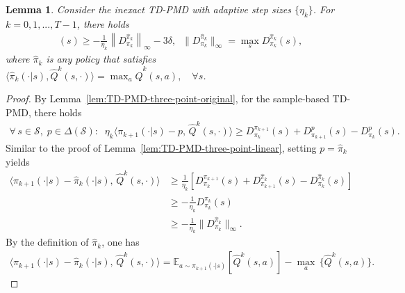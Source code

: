 \documentclass[10pt]{article}
\newcommand{\calS}{\mathcal{S}}
\newcommand{\calT}{\mathcal{T}}
\newcommand{\E}{\mathbb{E}}
\newcommand{\ls}{\left}
\newcommand{\rs}{\right}
\theoremstyle{plain}
\newtheorem{lemma}[theorem]{Lemma}
\theoremstyle{definition}
\begin{document}
\begin{lemma}
    Consider the inexact TD-PMD  with adaptive step sizes $\{ \eta_k \}$. For $k=0, 1, ..., T-1$,  there holds
    \begin{align}
       [\widehat{\calT}^{\pi_{k+1}} V^k - \calT V^k](s) \geq -\frac{1}{\eta
         _k}\ls\| {D}_{\pi_k}^{\widehat{\pi}_k} \rs\|_\infty - 3\delta, \;\; \|{D}_{\pi_k}^{\widehat{\pi}_k}\|_\infty = \max_{s} D_{\pi_k}^{\widehat{\pi}_k}(s),
        \label{eq:TD-PMD-three-point-linear-inexact}
    \end{align}
    where $\widehat{\pi}_k$ is any policy that satisfies $\langle\widehat{\pi}_k(\cdot|s),\widehat{Q}^k(s,\cdot)\rangle = \max_a\widehat{Q}^{k}(s,a),\quad\forall s$.
    \label{lem:TD-PMD-three-point-linear-inexact}
\end{lemma}
\begin{proof}
    By Lemma~\ref{lem:TD-PMD-three-point-original}, for the sample-based TD-PMD, there holds
    \begin{align*}
        \forall\, s\in\calS,\; p\in\Delta(\calS): \;\; \eta_k \langle \pi_{k+1}(\cdot|s) - p, \, \widehat{Q}^k(s,\cdot) \rangle \geq D^{\pi_{k+1}}_{\pi_k}(s) + D^p_{\pi_{k+1}}(s) - D^p_{\pi_k}(s).
    \end{align*}
    Similar to the proof of Lemma~\ref{lem:TD-PMD-three-point-linear}, setting $p=\widehat{\pi}_k $ yields
    \begin{align*}
            \langle \pi_{k+1}(\cdot|s) - \widehat{\pi}_k(\cdot|s), \, \widehat{Q}^k(s,\cdot) \rangle &\geq \frac{1}{\eta_k}[D^{\pi_{k+1}}_{\pi_k}(s) + D^{\widehat{\pi}_k}_{\pi_{k+1}}(s) - D^{\widehat{\pi}_k}_{\pi_k}(s)] \\
            &\geq -\frac{1}{\eta_k} D^{\widehat{\pi}_k}_{\pi_k}(s) \\
            &\geq -\frac{1}{\eta_k} \| {D}_{\pi_k}^{\widehat{\pi}_k} \|_\infty.
    \end{align*}
    By the definition of $\widehat{\pi}_k$, one has
    \begin{align*}
        \langle \pi_{k+1}(\cdot|s) - \widehat{\pi}_k(\cdot|s), \, \widehat{Q}^k(s,\cdot) \rangle = \E_{a\sim\pi_{k+1}(\cdot|s)}[\widehat{Q}^k(s,a)] - \max_a \, \{\widehat{Q}^k(s,a)\}.
    \end{align*}
    

\end{proof}
\end{document}
